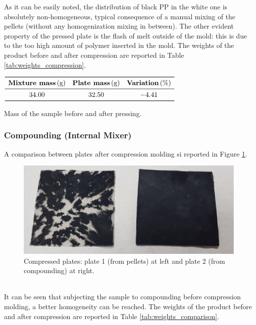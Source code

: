 \documentclass[a4paper, 11pt]{article}
\begin{document}
As it can be easily noted, the distribution of black PP in the white one is absolutely non-homogeneous, typical consequence of a manual mixing of the pellets (without any homogenization mixing in between). The other evident property of the pressed plate is the flash of melt outside of the mold: this is due to the too high amount of polymer inserted in the mold. 
The weights of the product before and after compression are reported in Table \ref{tab:weights_compression}. 

\begin{table}[htp]
	\centering
	$
	\begin{array}{ccc}
	\toprule
	\textbf{Mixture mass}\,\text{(g)} & \textbf{Plate mass}\,\text{(g)} & \textbf{Variation}\,\text{(\%)} \\
	\midrule
	34.00 & 32.50 & -4.41\\
	\bottomrule
	\end{array}
	$
	\caption{Mass of the sample before and after pressing.}
	\label{tab:weights_compression}
\end{table}

\subsubsection{Compounding (Internal Mixer)}

A comparison between plates after compression molding si reported in Figure \ref{fig:plates}.
\begin{figure}[htp]
	\centering
	\includegraphics[scale=0.4]
	{PIATTI.jpg}
	\caption{Compressed plates: plate 1 (from pellets) at left and plate 2 (from compounding) at right.}
	\label{fig:plates}
\end{figure}\\
It can be seen that subjecting the sample to compounding before compression molding, a better homogeneity can  be reached.
The weights of the product before and after compression are reported in Table \ref{tab:weights_comparison}.
\end{document}
